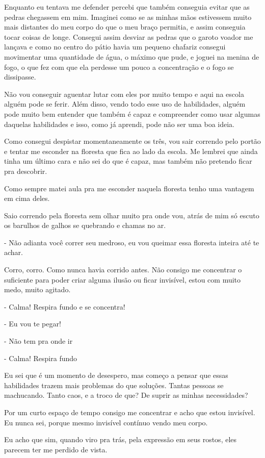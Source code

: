 Enquanto eu tentava me defender percebi que também conseguia evitar que as pedras chegassem em mim. Imaginei como se as minhas mãos estivessem muito mais distantes do meu corpo do que o meu braço permitia, e assim conseguia tocar coisas de longe. Consegui assim desviar as pedras que o garoto voador me lançava e como no centro do pátio havia um pequeno chafariz consegui movimentar uma quantidade de água, o máximo que pude, e joguei na menina de fogo, o que fez com que ela perdesse um pouco a concentração e o fogo se dissipasse.

Não vou conseguir aguentar lutar com eles por muito tempo e aqui na escola alguém pode se ferir. Além disso, vendo todo esse uso de habilidades, alguém pode muito bem entender que também é capaz e compreender como usar algumas daquelas habilidades e isso, como já aprendi, pode não ser uma boa ideia.

Como consegui despistar momentaneamente os três, vou sair correndo pelo portão e tentar me esconder na floresta que fica ao lado da escola. Me lembrei que ainda tinha um último cara e não sei do que é capaz, mas também não pretendo ficar pra descobrir.

Como sempre matei aula pra me esconder naquela floresta tenho uma vantagem em cima deles.

Saio correndo pela floresta sem olhar muito pra onde vou, atrás de mim só escuto os barulhos de galhos se quebrando e chamas no ar.

- Não adianta você correr seu medroso, eu vou queimar essa floresta inteira até te achar.

Corro, corro. Como nunca havia corrido antes. Não consigo me concentrar o suficiente para poder criar alguma ilusão ou ficar invisível, estou com muito medo, muito agitado.

- Calma! Respira fundo e se concentra!

- Eu vou te pegar!

- Não tem pra onde ir

- Calma! Respira fundo

Eu sei que é um momento de desespero, mas começo a pensar que essas habilidades trazem mais problemas do que soluções. Tantas pessoas se machucando. Tanto caos, e a troco de que? De suprir as minhas necessidades?

Por um curto espaço de tempo consigo me concentrar e acho que estou invisível. Eu nunca sei, porque mesmo invisível contínuo vendo meu corpo.

Eu acho que sim, quando viro pra trás, pela expressão em seus rostos, eles parecem ter me perdido de vista.

